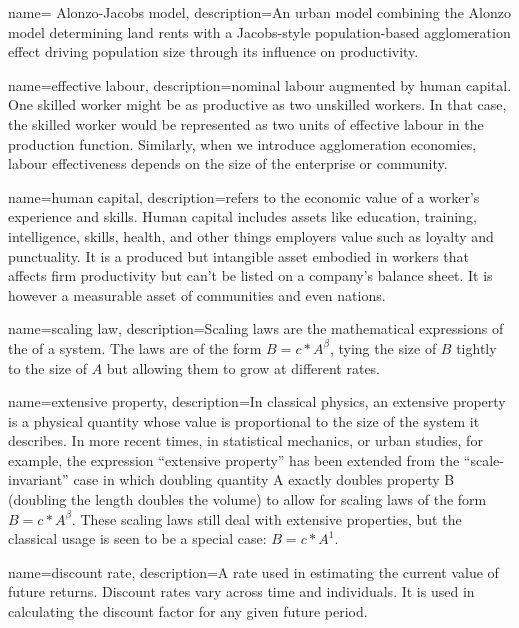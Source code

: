 {
name= Alonzo-Jacobs model,
description={An urban model combining the Alonzo \cite{alonsoModelUrbanLand1960}model determining land rents with a Jacobs-style population-based \gls{agglomeration} effect \cite{jacobsEconomyCities1969} driving population size through its influence on productivity.}
}


{
name=effective labour,
description={nominal labour augmented by \gls{human capital}. One skilled worker might be as productive as two unskilled workers. In that case,  the skilled worker would be represented as two units of effective labour in the  \gls{production function}. Similarly, when we introduce \gls{agglomeration} economies, labour effectiveness depends on the size of the enterprise or community.}
}


{
name=human capital,
description={refers to the economic value of a worker's experience and skills. Human capital includes assets like education, training, intelligence, skills, health, and other things employers value such as loyalty and punctuality. It is a produced but intangible asset embodied in workers that affects firm productivity but can't be listed on a company's balance sheet. It is however a measurable asset of communities and even nations.}
}

{
name=scaling law,
description={Scaling laws are the mathematical expressions of the  
of a system. The laws are of the form  $B=c*A^\beta$, tying the size of $B$ tightly to the size of $A$ but allowing them to grow at different rates.}
}

{
name=extensive property,
description={In classical physics, an extensive property is a physical quantity whose value is proportional to the size of the system it describes. In more recent times, in statistical mechanics, or urban studies, for example, the expression ``extensive property'' has been extended from the ``scale-invariant'' case in which doubling quantity A exactly doubles property B (doubling the length doubles the volume) to allow for scaling laws of the form $B=c*A^\beta$. These \glspl{scaling law} still deal with extensive properties, but the classical usage is seen to be a special case: $B=c*A^1$.}
}

{
name=discount rate,
description={A rate used in estimating the current value of future returns. Discount rates vary across time and individuals. It is used in calculating the \gls{discount factor} for any given future period.}
}

